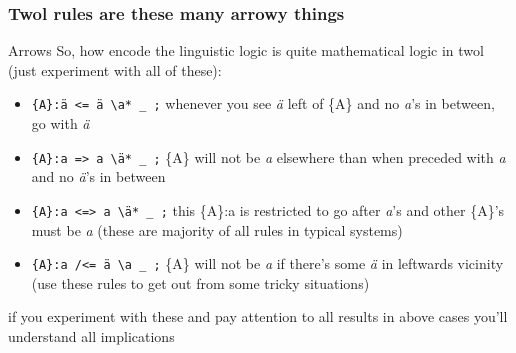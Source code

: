 \documentclass[10pt,xetex]{beamer} %
\begin{document}
\begin{frame}
    \frametitle{Twol rules are these many arrowy things}
    \begin{block}{Arrows}
    So, how encode the linguistic logic is quite mathematical logic in twol
    (just experiment with all of these):
    \begin{itemize}
        \item \texttt{\{A\}:ä <= ä \textbackslash a* \_ ;} whenever you see \textit{ä} left
            of \{A\} and no \textit{a}'s in between, go with \textit{ä}
        \item \texttt{\{A\}:a => a \textbackslash ä* \_ ;} \{A\} will not be \textit{a} elsewhere
            than when preceded with \textit{a} and no \textit{ä}'s in between
        \item \texttt{\{A\}:a <=> a \textbackslash ä* \_ ;} this \{A\}:a is restricted
            to go after \textit{a}'s and other \{A\}'s must be \textit{a} (these are majority of all
            rules in typical systems)
        \item \texttt{\{A\}:a /<= ä \textbackslash a \_ ;} \{A\} will not be \textit{a} if
            there's some \textit{ä} in leftwards vicinity (use these rules to
            get out from some tricky situations)
    \end{itemize}
    if you experiment with these and pay attention to all results in above
    cases you'll understand all implications
    \end{block}
\end{frame}
\end{document}
